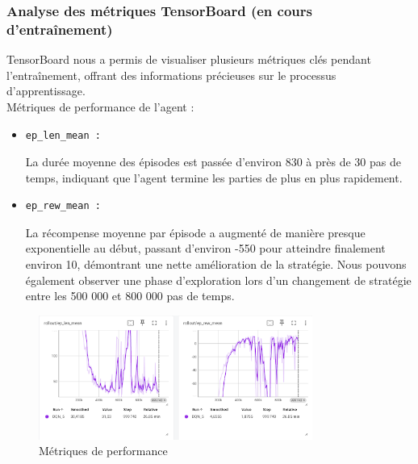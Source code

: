 \documentclass{article}
\begin{document}
    \subsubsection{Analyse des métriques TensorBoard (en cours d'entraînement)}

    \quad TensorBoard nous a permis de visualiser plusieurs métriques clés pendant l'entraînement, offrant des informations précieuses sur le processus d'apprentissage.\\

    Métriques de performance de l'agent :
    \begin{itemize} 
        \item \begin{verbatim}ep_len_mean :\end{verbatim}La durée moyenne des épisodes est passée d'environ 830 à près de 30 pas de temps, indiquant que l'agent termine les parties de plus en plus rapidement.
        \item \begin{verbatim}ep_rew_mean :\end{verbatim}La récompense moyenne par épisode a augmenté de manière presque exponentielle au début, passant d'environ -550 pour atteindre finalement environ 10, démontrant une nette amélioration de la stratégie. Nous pouvons également observer une phase d'exploration lors d'un changement de stratégie entre les 500 000 et 800 000 pas de temps.
    \end{itemize}

    \begin{figure}[ht]
        \centering
        \includegraphics[width=0.8\textwidth]{10.png}
        \caption{Métriques de performance}
    \end{figure}
    
\end{document}
